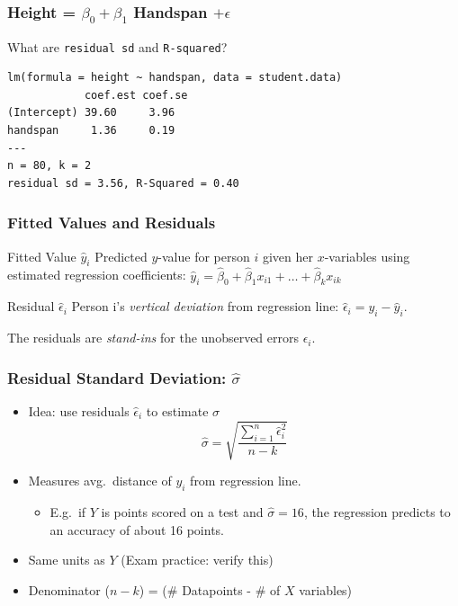 \begin{frame}[fragile]
\frametitle{Height = $\beta_0 + \beta_1$ Handspan $+ \epsilon$}
\alert{What are \texttt{residual sd} and \texttt{R-squared}?}
\footnotesize
\begin{verbatim}
lm(formula = height ~ handspan, data = student.data)
            coef.est coef.se
(Intercept) 39.60     3.96  
handspan     1.36     0.19  
---
n = 80, k = 2
residual sd = 3.56, R-Squared = 0.40
\end{verbatim}
\end{frame}

\begin{frame}
\frametitle{Fitted Values and Residuals}

\begin{block}{Fitted Value $\widehat{y}_i$}
Predicted $y$-value for person $i$ given her $x$-variables using estimated regression coefficients: \alert{$\widehat{y}_i = \widehat{\beta}_0 + \widehat{\beta}_1 x_{i1} + \hdots + \widehat{\beta}_k x_{ik}$}
\end{block}


\begin{block}{Residual $\widehat{\epsilon}_i$}
  Person i's \emph{vertical deviation} from regression line: \alert{$\widehat{\epsilon}_i = y_i - \widehat{y}_i$}. 
\end{block}

\vspace{1em}
\alert{The residuals are \emph{stand-ins} for the unobserved errors $\epsilon_i$.}

\end{frame}
\begin{frame}
\frametitle{Residual Standard Deviation: $\widehat{\sigma}$}
	\begin{itemize}
    \item Idea: use residuals $\widehat{\epsilon}_i$ to estimate $\sigma$
	$$\widehat{\sigma}  = \sqrt{\frac{\sum_{i=1}^n \widehat{\epsilon}_i^2}{n -k}}$$ 
		\item Measures avg.\ distance of $y_i$ from regression line.
				\begin{itemize}
					\item E.g.\ if $Y$ is points scored on a test and $\widehat{\sigma}=16$, the regression predicts to an accuracy of about 16 points. 
				\end{itemize}
	\item Same units as $Y$ (Exam practice: verify this) 
	\item Denominator  ($n-k$) = (\# Datapoints - \# of $X$ variables) 
	\end{itemize}

\end{frame}




